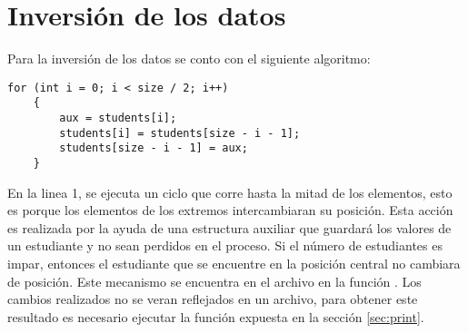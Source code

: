 \section{Inversión de los datos}

Para la inversión de los datos se conto con el siguiente algoritmo:

\begin{lstlisting}[style=CStyle]
    for (int i = 0; i < size / 2; i++)
    {
        aux = students[i];
        students[i] = students[size - i - 1];
        students[size - i - 1] = aux;
    }
\end{lstlisting}

En la linea 1, se ejecuta un ciclo que corre hasta la mitad de los elementos, esto es porque los elementos de los extremos intercambiaran su posición. Esta acción es realizada por la ayuda de una estructura auxiliar que guardará los valores de un estudiante y no sean perdidos en el proceso. Si el número de estudiantes es impar, entonces el estudiante que se encuentre en la posición central no cambiara de posición. Este mecanismo se encuentra en el archivo  en la función . Los cambios realizados no se veran reflejados en un archivo, para obtener este resultado es necesario ejecutar la función expuesta en la sección \ref{sec:print}.